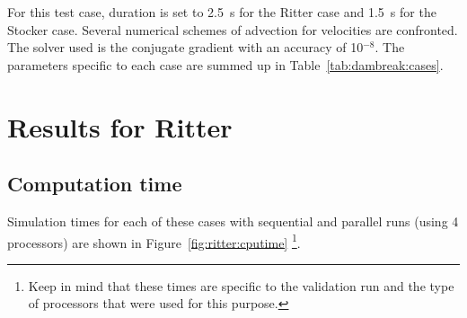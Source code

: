 For this test case, duration is set to 2.5~s for the Ritter case and
1.5~s for the Stocker case.
Several numerical schemes of advection for velocities are confronted.
The solver used is the conjugate gradient with an accuracy of 10$^{-8}$.
The parameters specific to each case are summed up in
Table~\ref{tab:dambreak:cases}.
\begin{table}[H]
  \caption{List of the simulation parameters used for the seven cases tested in the Ritter and Stokes cases.}
  \label{tab:dambreak:cases}
\end{table}

\section{Results for Ritter}


\subsection{Computation time}

Simulation times for each of these cases with sequential and parallel runs
(using 4 processors) are shown in Figure~\ref{fig:ritter:cputime}
\footnote{Keep in mind that these times
are specific to the validation run and the type of processors that were used for this purpose.}.

